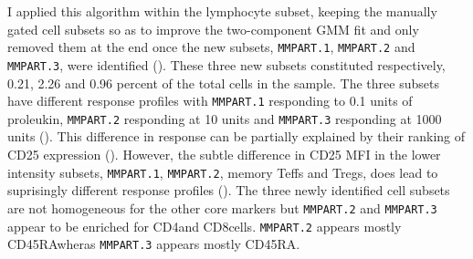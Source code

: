 I applied this algorithm within the lymphocyte subset, keeping the manually gated cell subsets so as to improve the two-component GMM fit and only removed them at the end once the new subsets, \texttt{MMPART.1}, \texttt{MMPART.2} and \texttt{MMPART.3}, were identified ().
These three new subsets constituted respectively, 0.21, 2.26 and 0.96 percent of the total cells in the sample.
The three subsets have different response profiles with \texttt{MMPART.1} responding to 0.1 units of proleukin, \texttt{MMPART.2} responding at 10 units and \texttt{MMPART.3} responding at 1000 units ().
This difference in response can be partially explained by their ranking of CD25 expression ().
However, the subtle difference in CD25 MFI in the lower intensity subsets, \texttt{MMPART.1}, \texttt{MMPART.2}, memory Teffs and Tregs, does lead to suprisingly different response profiles ().
The three newly identified cell subsets are not homogeneous for the other core markers but \texttt{MMPART.2} and \texttt{MMPART.3} appear to be enriched for CD4\negative and CD8\positive cells.
\texttt{MMPART.2} appears mostly CD45RA\negative wheras \texttt{MMPART.3} appears mostly CD45RA\positive.

